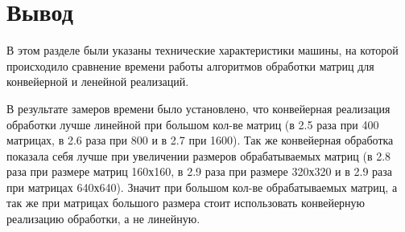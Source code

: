 

\clearpage

\section{Вывод}

В этом разделе были указаны технические характеристики машины, на которой происходило сравнение времени работы алгоритмов обработки матриц для конвейерной и ленейной реализаций.

В результате замеров времени было установлено, что конвейерная реализация обработки лучше линейной
при большом кол-ве матриц (в 2.5 раза при 400 матрицах, в 2.6 раза при 800 и в 2.7 при 1600). Так же конвейерная обработка показала себя лучше при увеличении размеров обрабатываемых матриц (в 2.8 раза при размере матриц 160х160, в 2.9 раза при размере 320х320 и в 2.9 раза при матрицах 640х640). Значит при большом кол-ве обрабатываемых матриц, а так же при матрицах большого размера стоит использовать конвейерную реализацию обработки, а не линейную.


